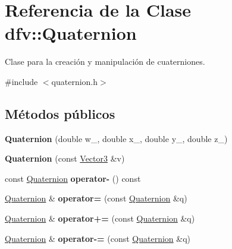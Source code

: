 \hypertarget{classdfv_1_1Quaternion}{\section{\-Referencia de la \-Clase dfv\-:\-:\-Quaternion}
\label{classdfv_1_1Quaternion}
}


\-Clase para la creación y manipulación de cuaterniones.  




{\ttfamily \#include $<$quaternion.\-h$>$}

\subsection*{\-Métodos públicos}
\begin{DoxyCompactItemize}
\item 
\hypertarget{classdfv_1_1Quaternion_a239d4109488e9f46124aeabd6180ea20}{{\bfseries \-Quaternion} (double w\-\_\-, double x\-\_\-, double y\-\_\-, double z\-\_\-)}\label{classdfv_1_1Quaternion_a239d4109488e9f46124aeabd6180ea20}

\item 
\hypertarget{classdfv_1_1Quaternion_a0f89714025bf6e5a7a6a5bfb2f1271d6}{{\bfseries \-Quaternion} (const \hyperlink{classdfv_1_1Vector3}{\-Vector3} \&v)}\label{classdfv_1_1Quaternion_a0f89714025bf6e5a7a6a5bfb2f1271d6}

\item 
\hypertarget{classdfv_1_1Quaternion_aa1cefcee3c9810a16520be2dbd0d830f}{const \hyperlink{classdfv_1_1Quaternion}{\-Quaternion} {\bfseries operator-\/} () const }\label{classdfv_1_1Quaternion_aa1cefcee3c9810a16520be2dbd0d830f}

\item 
\hypertarget{classdfv_1_1Quaternion_a6301cfa00246664d767765fb692fb0e0}{\hyperlink{classdfv_1_1Quaternion}{\-Quaternion} \& {\bfseries operator=} (const \hyperlink{classdfv_1_1Quaternion}{\-Quaternion} \&q)}\label{classdfv_1_1Quaternion_a6301cfa00246664d767765fb692fb0e0}

\item 
\hypertarget{classdfv_1_1Quaternion_a5b9939d9065cba305b8983c1475a8b8f}{\hyperlink{classdfv_1_1Quaternion}{\-Quaternion} \& {\bfseries operator+=} (const \hyperlink{classdfv_1_1Quaternion}{\-Quaternion} \&q)}\label{classdfv_1_1Quaternion_a5b9939d9065cba305b8983c1475a8b8f}

\item 
\hypertarget{classdfv_1_1Quaternion_a3fdafbcff5c33582758e88fbb5458e6e}{\hyperlink{classdfv_1_1Quaternion}{\-Quaternion} \& {\bfseries operator-\/=} (const \hyperlink{classdfv_1_1Quaternion}{\-Quaternion} \&q)}\label{classdfv_1_1Quaternion_a3fdafbcff5c33582758e88fbb5458e6e}


\end{DoxyCompactItemize}

